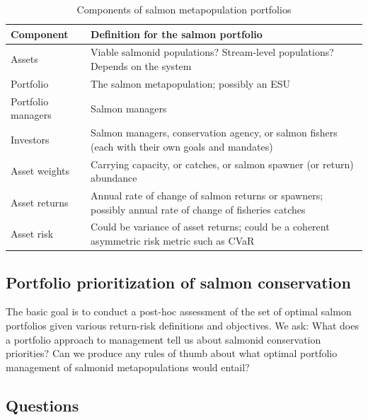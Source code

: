\documentclass[12pt]{article}
\begin{document}
\begin{table}[h!]
\centering
\small
\caption{Components of salmon metapopulation portfolios}
\begin{tabular}{p{3.6cm}p{7.5cm}}
\toprule
Component & Definition for the salmon portfolio\\
\midrule
Assets & Viable salmonid populations? Stream-level populations? Depends on the 
system\\
Portfolio & The salmon metapopulation; possibly an ESU\\
Portfolio managers & Salmon managers\\
Investors & Salmon managers, conservation agency, or salmon fishers (each with 
their own goals and mandates)\\
Asset weights & Carrying capacity, or catches, or salmon spawner (or return) 
abundance\\
Asset returns & Annual rate of change of salmon returns or spawners; possibly 
annual rate of change of fisheries catches\\
Asset risk & Could be variance of asset returns; could be a coherent asymmetric 
risk metric such as CVaR\\
\bottomrule
\end{tabular}
\label{tab:port-components}
\end{table}

\subsection{Portfolio prioritization of salmon conservation}

The basic goal is to conduct a post-hoc assessment of the set of optimal
salmon portfolios given various return-risk definitions and objectives.
We ask: What does a portfolio approach to management tell us about
salmonid conservation priorities? Can we produce any rules of thumb
about what optimal portfolio management of salmonid metapopulations
would entail?

\subsection{Questions}
\end{document}
